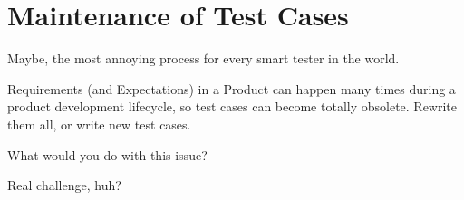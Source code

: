 \section{Maintenance of Test Cases}
\label{sec:Maintenance of Test Cases}

Maybe, the most annoying process for every smart tester in the world.

Requirements (and Expectations) in a Product can happen many times during a product development lifecycle, so test cases can become totally obsolete. Rewrite them all, or write new test cases.

What would you do with this issue?

Real challenge, huh?